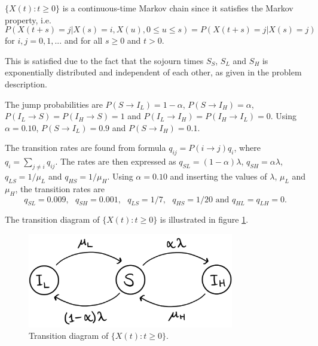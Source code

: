 $\{X(t):t \geq 0 \}$ is a continuous-time Markov chain since it satisfies the Markov property, i.e. 
$$P(X(t+s)=j|X(s)=i, X(u), 0 \leq u \leq s)=P(X(t+s)=j|X(s)=j)$$ 
for $i,j = 0,1,...$ and for all $s \geq 0$ and $t >0 $. 

This is satisfied due to the fact that the sojourn times $S_S$, $S_L$ and $S_H$ is  exponentially distributed and independent of each other, as given in the problem description.  


The jump probabilities are $P(S \rightarrow I_L)= 1 - \alpha$, $P(S \rightarrow I_H)= \alpha$, $P(I_L \rightarrow S)= P(I_H \rightarrow S) = 1$ and $P(I_L \rightarrow I_H)= P(I_H \rightarrow I_L) = 0$. Using $\alpha = 0.10$, $P(S \rightarrow I_L)= 0.9$ and $P(S \rightarrow I_H)= 0.1$. 

The transition rates are found from formula $q_{ij} = P(i \rightarrow j ) q_i$, where $q_i = \sum_{j \neq i} q_{ij}$. The rates are then expressed as $q_{SL} = (1-\alpha)\lambda $, $q_{SH} = \alpha \lambda$, $q_{LS} = 1/\mu_L$ and $q_{HS} = 1/\mu_H$. Using $\alpha = 0.10$ and inserting the values of $\lambda$, $\mu_L$ and $\mu_H$, the transition rates are 
$$q_{SL} = 0.009,\text{ } q_{SH} = 0.001, \text{ } q_{LS} = 1/7, \text{ } q_{HS} = 1/20 \text{ and } q_{HL}=q_{LH}=0.$$

The transition diagram of $\{X(t):t \geq 0 \}$ is illustrated in figure \ref{transdiagramA}. 

\begin{figure}
    \centering
    \includegraphics[width=90mm]{TransDiag1A.png}
    \caption{Transition diagram of $\{X(t):t\geq0\}$.}
    \label{transdiagramA}
\end{figure}




